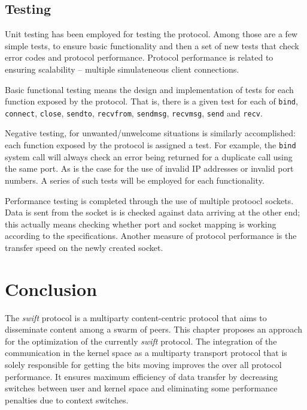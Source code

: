 \subsection{Testing}

Unit testing has been employed for testing the protocol. Among those are a few
simple tests, to ensure basic functionality and then a set of new tests that
check error codes and protocol performance. Protocol performance is related to
ensuring scalability -- multiple simulateneous client connections.

Basic functional testing means the design and implementation of tests for each
function exposed by the protocol. That is, there is a given test for each of
\texttt{bind}, \texttt{connect}, \texttt{close}, \texttt{sendto},
\texttt{recvfrom}, \texttt{sendmsg}, \texttt{recvmsg}, \texttt{send} and
\texttt{recv}.

Negative testing, for unwanted/unwelcome situations is similarly accomplished:
each function exposed by the protocol is assigned a test. For example, the
\texttt{bind} system call will always check an error being returned for a
duplicate call using the same port. As is the case for the use of invalid IP
addresses or invalid port numbers. A series of such tests will be employed for
each functionality.

Performance testing is completed through the use of multiple protoocl sockets.
Data is sent from the socket is is checked against data arriving at the other
end; this actually means checking whether port and socket mapping is working
according to the specifications. Another measure of protocol performance is
the transfer speed on the newly created socket.

\section{Conclusion}
\label{sec:multiparty:conclusion}

The \textit{swift} protocol is a multiparty content-centric protocol that aims
to disseminate content among a swarm of peers. This chapter proposes an
approach for the optimization of the currently \textit{swift} protocol. The
integration of the communication in the kernel space as a multiparty transport
protocol that is solely responsible for getting the bits moving improves the
over all protocol performance. It ensures maximum efficiency of data transfer
by decreasing switches between user and kernel space and eliminating some
performance penalties due to context switches.

